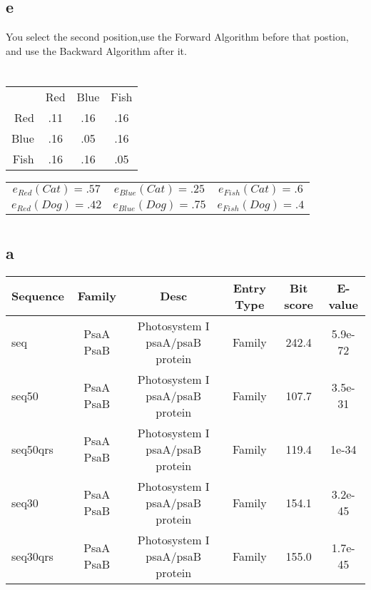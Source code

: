 \documentclass[12pt]{article}
\begin{document}
\subsection*{e}
You select the second position,use the Forward Algorithm before that postion, and use the Backward Algorithm after it.

\section{}
\begin{tabular}{r c c c}
		& 	Red	&	Blue	& 	Fish	\\
	Red	&	.11	&	.16	&	.16	\\
	Blue	&	.16	&	.05	&	.16	\\
	Fish	&	.16	&	.16	&	.05	\\
\end{tabular}

\begin{center}
\begin{tabular}{| c | c | c |}
	\hline
	$ e_{Red}(Cat) = .57 $	&	$e_{Blue}(Cat) =	.25$ &	$e_{Fish}(Cat) = .6 $ \\
	$ e_{Red}(Dog) = .42 $	&	$e_{Blue}(Dog) =	.75$ &	$e_{Fish}(Dog) = .4$ \\
	\hline
\end{tabular}
\end{center}

\section{}

\subsection*{a}
\scriptsize
\begin{tabular}{ | l | c | c | c | c  | c |}
	\hline
		\textbf{Sequence}	&	\textbf{Family}	& \textbf{Desc}	&	\textbf{Entry Type}	&	\textbf{Bit score}		&	\textbf{E-value}\\
	\hline
		seq	&	PsaA PsaB	&	Photosystem I psaA/psaB protein	&	Family	&	242.4	&	5.9e-72			\\
	\hline
		seq50	&	PsaA PsaB	&	Photosystem I psaA/psaB protein	&	Family	&	107.7	&	3.5e-31		\\
	\hline
		seq50qrs	&	PsaA PsaB	&	Photosystem I psaA/psaB protein	&	Family	&	119.4	&	1e-34		\\
	\hline		
		seq30	&	PsaA PsaB	&	Photosystem I psaA/psaB protein	&	Family	&	154.1	&	3.2e-45		\\
	\hline
		seq30qrs	&	PsaA PsaB	&	Photosystem I psaA/psaB protein	&	Family	&	155.0	&	1.7e-45		\\
	\hline
\end{tabular} \\ \\
\normalsize
\end{document}
